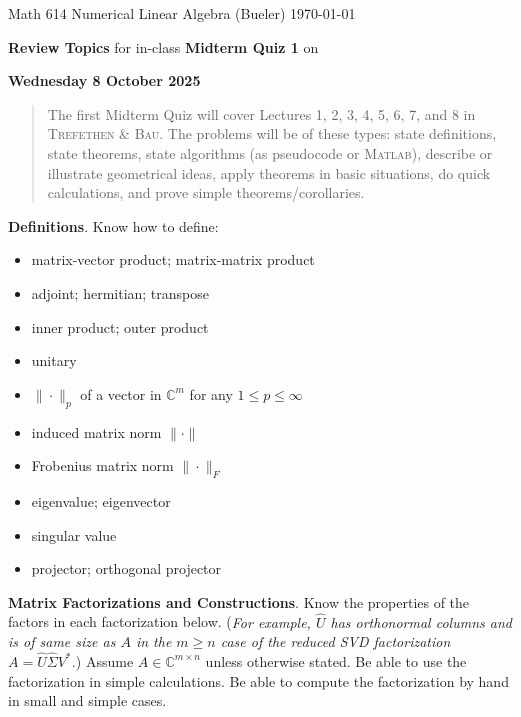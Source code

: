 \documentclass[11pt]{amsart}
\newcommand{\normalspacing}{\renewcommand{\baselinestretch}{1.1}\tiny\normalsize}
\newcommand{\bigspacing}{\renewcommand{\baselinestretch}{1.21}\tiny\normalsize}
\newcommand{\CC}{{\mathbb{C}}}
\newcommand{\Matlab}{\textsc{Matlab}\xspace}
\newcommand{\textbook}{\textsc{Trefethen \& Bau}}
\begin{document}
\scriptsize \noindent Math 614 Numerical Linear Algebra (Bueler) \hfill \today
\thispagestyle{empty}

\bigskip
\Large\centerline{\textbf{Review Topics} for in-class \textbf{Midterm Quiz 1} on}

\Large\centerline{\textbf{Wednesday 8 October 2025}}

\normalsize
\bigskip
\begin{quote}
The first Midterm Quiz will cover Lectures 1, 2, 3, 4, 5, 6, 7, and 8 in \textbook.  The problems will be of these types: state definitions, state theorems, state algorithms (as pseudocode or \Matlab), describe or illustrate geometrical ideas, apply theorems in basic situations, do quick calculations, and prove simple theorems/corollaries.
\end{quote}
\bigskip

\bigspacing
\noindent \textbf{Definitions}. Know how to define:
\begin{itemize}
\item matrix-vector product; matrix-matrix product
\item adjoint; hermitian; transpose
\item inner product; outer product
\item unitary
\item $\|\cdot\|_p$ of a vector in $\CC^m$ for any $1\le p \le \infty$
\item induced matrix norm $\|\cdot\|$
\item Frobenius matrix norm $\|\cdot\|_F$
\item eigenvalue; eigenvector
\item singular value
\item projector; orthogonal projector
\end{itemize}

\normalspacing

\medskip\noindent \textbf{Matrix Factorizations and Constructions}.  Know the properties of the factors in each factorization below.  (\emph{For example, $\hat U$ has orthonormal columns and is of same size as $A$ in the $m\ge n$ case of the reduced SVD factorization $A=\hat U \hat \Sigma V^*$.})  Assume $A\in \CC^{m\times n}$ unless otherwise stated.  Be able to use the factorization in simple calculations.  Be able to compute the factorization by hand in small and simple cases.
\end{document}
